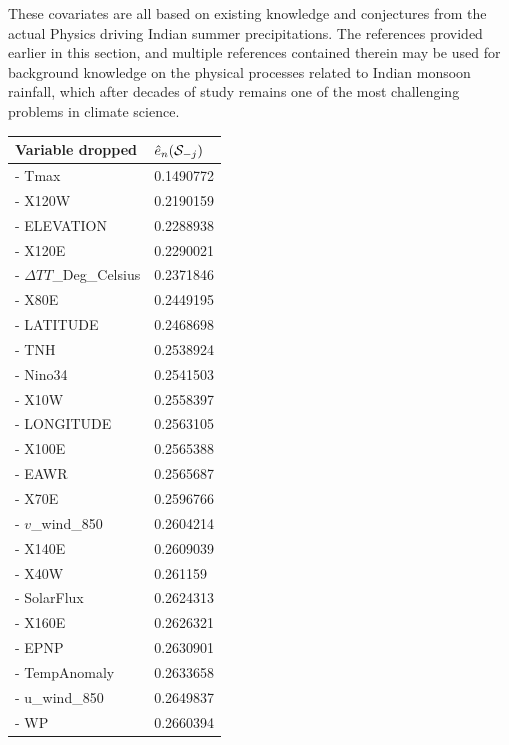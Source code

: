 These covariates are all based on existing knowledge and conjectures from the actual Physics driving Indian summer precipitations. The references provided earlier in this section, and multiple references contained therein may be used for background knowledge on the physical processes related to Indian monsoon rainfall, which after decades of study remains one of the most challenging problems in climate science.

\begin{table}
\centering
\begin{scriptsize}
   \begin{tabular}{l|l}
    \hline
      Variable dropped      & $\hat e_n ({\cal{S}}_{-j})$        \\ \hline
    - Tmax                  & 0.1490772 \\
    - X120W                 & 0.2190159 \\
    - ELEVATION             & 0.2288938 \\
    - X120E                 & 0.2290021 \\
    - $\Delta TT$\_Deg\_Celsius & 0.2371846 \\
    - X80E                  & 0.2449195 \\
    - LATITUDE              & 0.2468698 \\
    - TNH                   & 0.2538924 \\
    - Nino34                & 0.2541503 \\
    - X10W                  & 0.2558397 \\
    - LONGITUDE             & 0.2563105 \\
    - X100E                 & 0.2565388 \\
    - EAWR                  & 0.2565687 \\
    - X70E                  & 0.2596766 \\
    - $v$\_wind\_850          & 0.2604214 \\
    - X140E                 & 0.2609039 \\
    - X40W                  & 0.261159  \\
    - SolarFlux             & 0.2624313 \\
    - X160E                 & 0.2626321 \\
    - EPNP                  & 0.2630901 \\
    - TempAnomaly           & 0.2633658 \\
    - u\_wind\_850          & 0.2649837 \\
    - WP                    & 0.2660394 \\ \hline

\end{tabular}
\end{scriptsize}
\end{table}
